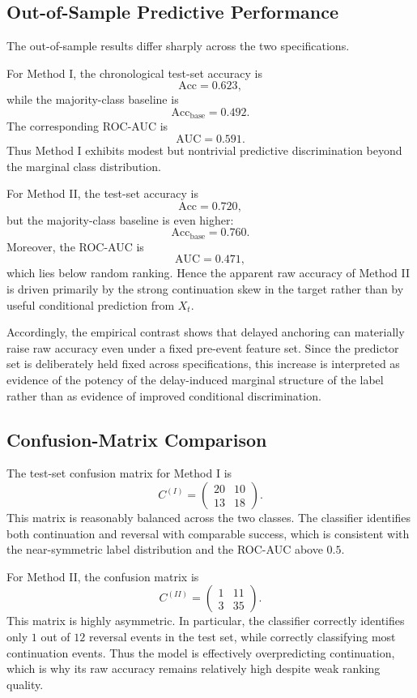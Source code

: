 \documentclass[11pt,a4paper]{article}
\begin{document}
	\subsection{Out-of-Sample Predictive Performance}

	The out-of-sample results differ sharply across the two specifications.

	For Method I, the chronological test-set accuracy is
	\[
	\mathrm{Acc}=0.623,
	\]
	while the majority-class baseline is
	\[
	\mathrm{Acc}_{\mathrm{base}}=0.492.
	\]
	The corresponding ROC-AUC is
	\[
	\mathrm{AUC}=0.591.
	\]
	Thus Method I exhibits modest but nontrivial predictive discrimination beyond the marginal class distribution.

	For Method II, the test-set accuracy is
	\[
	\mathrm{Acc}=0.720,
	\]
	but the majority-class baseline is even higher:
	\[
	\mathrm{Acc}_{\mathrm{base}}=0.760.
	\]
	Moreover, the ROC-AUC is
	\[
	\mathrm{AUC}=0.471,
	\]
	which lies below random ranking. Hence the apparent raw accuracy of Method II is driven primarily by the strong continuation skew in the target rather than by useful conditional prediction from \(X_t\).

	Accordingly, the empirical contrast shows that delayed anchoring can materially raise raw accuracy even under a fixed pre-event feature set. Since the predictor set is deliberately held fixed across specifications, this increase is interpreted as evidence of the potency of the delay-induced marginal structure of the label rather than as evidence of improved conditional discrimination.

	\subsection{Confusion-Matrix Comparison}

	The test-set confusion matrix for Method I is
	\[
	C^{(I)}=
	\begin{pmatrix}
	20 & 10\\
	13 & 18
	\end{pmatrix}.
	\]
	This matrix is reasonably balanced across the two classes. The classifier identifies both continuation and reversal with comparable success, which is consistent with the near-symmetric label distribution and the ROC-AUC above \(0.5\).

	For Method II, the confusion matrix is
	\[
	C^{(II)}=
	\begin{pmatrix}
	1 & 11\\
	3 & 35
	\end{pmatrix}.
	\]
	This matrix is highly asymmetric. In particular, the classifier correctly identifies only \(1\) out of \(12\) reversal events in the test set, while correctly classifying most continuation events. Thus the model is effectively overpredicting continuation, which is why its raw accuracy remains relatively high despite weak ranking quality.
\end{document}
